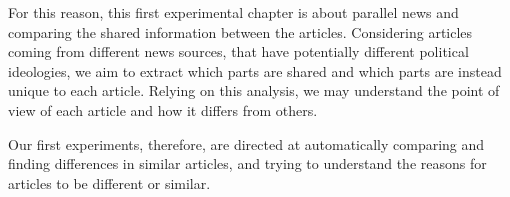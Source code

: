 For this reason, this first experimental chapter is about parallel news and comparing the shared information between the articles.
Considering articles coming from different news sources, that have potentially different political ideologies, we aim to extract which parts are shared and which parts are instead unique to each article.
Relying on this analysis, we may understand the point of view of each article and how it differs from others.

Our first experiments, therefore, are directed at automatically comparing and finding differences in similar articles, and trying to understand the reasons for articles to be different or similar.

